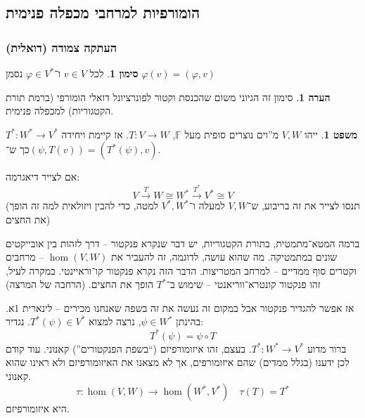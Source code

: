 \documentclass[a4paper]{article}
\newcommand\F         {\mathbb{F}}
\newcommand\co        {\colon}
\renewcommand\phi     {\varphi}
\theoremstyle{definition}
\newtheorem{Theorem}{משפט}
\newtheorem{Remark}{הערה}
\newtheorem{Notion}{סימון}
\newcommand\theo  [1] {\begin{Theorem}#1\end{Theorem}}
\newcommand\rmark [1] {\begin{Remark}#1\end{Remark}}
\newcommand\noti  [1] {\begin{Notion}#1\end{Notion}}
\begin{document}
	\subsection{הומורפיות למרחבי מכפלה פנימית}
	\subsubsection{העתקה צמודה (דואלית)}
	\noti{לכל $v \in V$ ו־$\phi \in V^*$ נסמן $\phi(v) = (\phi, v)$}
	\rmark{סימון זה הגיוני משום שהכנסת וקטור לפונרציונל דואלי הומורפי (ברמת תורת הקטגוריות) למכפלה פנימית. }
	\theo{ייהו $V, W$ מ''וים נוצרים סופית מעל $\F$, $T \co V \to W$. אז קיימת ויחידה $T^* \co W^* \to V^*$ כך ש־$(\psi, T(v)) = (T^*(\psi), v)$. }
	אם לצייר דיאגרמה: 
	\[ V \overset{T}{\to} W \cong W^* \overset{T^*}{\to} V^* \cong V \]
	(תנסו לצייר את זה בריבוע, ש־$V, W$ למעלה ו־$V^*, W^*$ למטה, כדי להבין ויזולאית למה זה הופך את החצים)
	
	ברמה המטא־מתמטית, בתורת הקטגוריות, יש דבר שנקרא פנקטור – דרך לזהות בין אובייקטים שונים במתמטיקה. מה שהוא עושה, לדוגמה, זה להעביר את $\hom(V, W)$ – מרחבים וקטרים סוף ממדיים – למרחב המטריצות. הדבר הזה נקרא פנקטור קו־וראיינטי. במקרה לעיל, זהו פנקטור קונטרא־ווריאנטי – שימוש ב־$T^*$ הופך את החצים. (הרחבה של המרצה)
	
	אז אפשר להגדיר פנקטור אבל במקום זה נעשה את זה בשפה שאנחנו מכירים – לינארית 1א. בהינתן $\psi \in W^*$, נרצה למצוא $T^*(\psi) \in V^*$. נגדיר: 
	\[ T^*(\psi) = \psi \circ T \]
	ברור מדוע $T^* \co W^* \to V^*$. בעצם, זהו איזומורפיזם (``בשפת הפנקטורים'') קאנוני. עוד קודם לכן ידענו (בגלל ממדים) שהם איזומורפים, אך לא מצאנו את האיזומורפיזם ולא ראינו שהוא קאנוני. 
	\[ \tau \co \hom(V, W) \to \hom(W^*, V^*) \quad \tau(T) = T^*  \]
	היא איזומורפיזם. 
	
\end{document}
